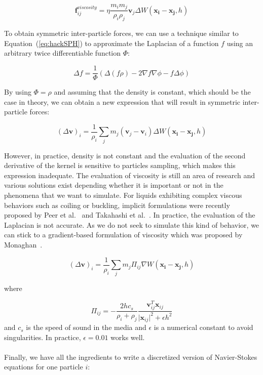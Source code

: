 \begin{equation}
\label{eq:nonSymmetricViscosityForce}
\mathbf{f}^{viscosity}_{ij} = \eta\frac{m_{i}m_{j}}{\rho_{i}\rho_{j}}\mathbf{v}_{j}\Delta W(\mathbf{x_{i}}-\mathbf{x_{j}},h)
\end{equation}

To obtain symmetric inter-particle forces, we can use a technique similar to Equation~(\ref{eq:hackSPH}) to approximate the Laplacian of a function $f$ using an arbitrary twice differentiable function $\Phi$:

\begin{equation}
\label{eq:hackSPH2}
\Delta f = 
\frac{1}{\Phi}
\left( \Delta \left( f\rho \right) - 2 \nabla f \nabla \phi - f \Delta \phi \right)
\end{equation}

By using $\Phi=\rho$ and assuming that the density is constant, which should be the case in theory, we can obtain a new expression that will result in symmetric inter-particle forces:

\begin{equation}
\left(\Delta \mathbf{v}\right)_{i} = \frac{1}{\rho_{i}}\sum_{j} m_{j} \left( \mathbf{v}_{j}-\mathbf{v}_{i}\right) \Delta W(\mathbf{x_{i}}-\mathbf{x_{j}},h)
\end{equation}

However, in practice, density is not constant and the evaluation of the second derivative of the kernel is sensitive to particles sampling, which makes this expression inadequate.
The evaluation of viscosity is still an area of research and various solutions exist depending whether it is important or not in the phenomena that we want to simulate.
For liquids exhibiting complex viscous behaviors such as coiling or buckling, implicit formulations were recently proposed by Peer et al.~\cite{Peer2015} and Takahashi et al.~\cite{Takahashi2015}.
In practice, the evaluation of the Laplacian is not accurate. 
As we do not seek to simulate this kind of behavior, we can stick to a gradient-based formulation of viscosity which was proposed by Monaghan~\cite{Monaghan2005}.

\begin{equation}
\label{eq:velocityLaplacianSPH}
\left(\Delta \mathbf{v}\right)_{i} = 
\frac{1}{\rho_{i}}
\sum_{j} m_{j} \Pi_{ij} \nabla W(\mathbf{x_{i}}-\mathbf{x_{j}},h)
\end{equation}

where 

\begin{equation}
    \Pi_{ij} = -\frac{2hc_{s}}{\rho_{i}+\rho_{j}}\frac{\mathbf{v}_{ij}^{T}\mathbf{x}_{ij}}{\vert \mathbf{x}_{ij} \vert^{2} + \epsilon h^{2}}
\end{equation}
and $c_{s}$ is the speed of sound in the media and $\epsilon$ is a numerical constant to avoid singularities.
In practice, $\epsilon=0.01$ works well.
\\ \\
Finally, we have all the ingredients to write a discretized version of Navier-Stokes equations for one particle $i$:

